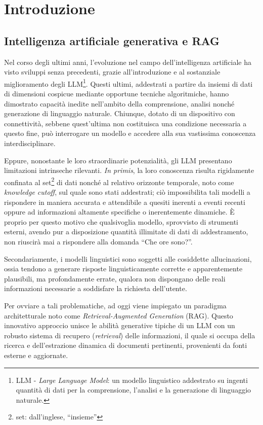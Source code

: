 \chapter{Introduzione}
\section{Intelligenza artificiale generativa e RAG}
Nel corso degli ultimi anni, l'evoluzione nel campo dell'intelligenza artificiale ha visto sviluppi senza precedenti, grazie all'introduzione e al sostanziale miglioramento degli LLM\footnote{LLM - \textit{Large Language Model}: un modello linguistico addestrato su ingenti quantità di dati per la comprensione, l'analisi e la generazione di linguaggio naturale.}. Questi ultimi, addestrati a partire da insiemi di dati di dimensioni cospicue mediante opportune tecniche algoritmiche, hanno dimostrato capacità inedite nell'ambito della comprensione, analisi nonché generazione di linguaggio naturale. Chiunque, dotato di un dispositivo con connettività, sebbene quest'ultima non costituisca una condizione necessaria a questo fine, può interrogare un modello e accedere alla sua vastissima conoscenza interdisciplinare.  

Eppure, nonostante le loro straordinarie potenzialità, gli LLM presentano limitazioni intrinseche rilevanti. \textit{In primis}, la loro conoscenza risulta rigidamente confinata al set\footnote{set: dall'inglese, ``insieme''} di dati nonché al relativo orizzonte temporale, noto come \textit{knowledge cutoff}, sul quale sono stati addestrati; ciò impossibilita tali modelli a rispondere in maniera accurata e attendibile a quesiti inerenti a eventi recenti oppure ad informazioni altamente specifiche o inerentemente dinamiche. È proprio per questo motivo che qualsivoglia modello, sprovvisto di strumenti esterni, avendo pur a disposizione quantità illimitate di dati di addestramento, non riuscirà mai a rispondere alla domanda ``Che ore sono?''.      

Secondariamente, i modelli linguistici sono soggetti alle cosiddette allucinazioni, ossia tendono a generare risposte linguisticamente corrette e apparentemente plausibili, ma profondamente errate, qualora non dispongano delle reali informazioni necessarie a soddisfare la richiesta dell'utente.

Per ovviare a tali problematiche, ad oggi viene impiegato un paradigma architetturale noto come \textit{Retrieval-Augmented Generation} (RAG). Questo innovativo approccio unisce le abilità generative tipiche di un LLM con un robusto sistema di recupero (\textit{retrieval}) delle informazioni, il quale si occupa della ricerca e dell'estrazione dinamica di documenti pertinenti, provenienti da fonti esterne e aggiornate. 

